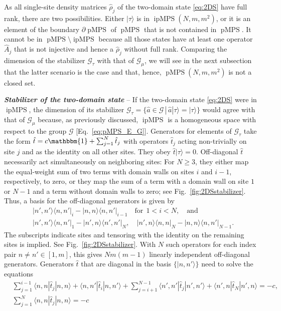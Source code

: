 \documentclass[english,11pt,aps,pra,onecolumn,tightenlines,groupedaddress,superscriptaddress,notitlepage,floatfix,fleqn]{revtex4-1}
\newcommand{\id}{\mathbbm{1}}
\newcommand{\bra}{\langle}
\newcommand{\ket}{\rangle}
\newcommand{\hA}{\hat{A}}
\newcommand{\hT}{\hat{t}}
\newcommand{\dm}{{\hat{\rho}}}
\newcommand{\mc}[1]{\mathcal{#1}}
\newcommand{\G}{\mc{G}}
\newcommand{\pMPS}{\operatorname{pMPS}}
\newcommand{\ipMPS}{\operatorname{ipMPS}}
\newcommand{\Emph}[1]{\textbf{\emph{#1}}}
\begin{document}
As all single-site density matrices $\dm_j$ of the two-domain state \eqref{eq:2DS} have full rank, there are two possibilities. Either $|\tau\ket$ is in $\ipMPS(N,m,m^2)$, or it is an element of the boundary $\partial\pMPS$ of $\pMPS$ that is not contained in $\pMPS$. It cannot be in $\pMPS\setminus \ipMPS$ because all those states have at least one operator $\hA_j$ that is not injective and hence a $\dm_j$ without full rank. Comparing the dimension of the stabilizer $\G_\tau$ with that of $\G_\mu$, we will see in the next subsection that the latter scenario is the case and that, hence, $\pMPS(N,m,m^2)$ is not a closed set.

\Emph{Stabilizer of the two-domain state} -- 
If the two-domain state \eqref{eq:2DS} were in $\ipMPS$, the dimension of its stabilizer $\G_\tau=\{\hat{a}\in\G\,|\,\hat{a}|\tau\ket=|\tau\ket\}$ would agree with that of $\G_{\mu}$ because, as previously discussed, $\ipMPS$ is a homogeneous space with respect to the group $\G$ [Eq.~\eqref{eq:pMPS_E_G}]. Generators for elements of $\G_\tau$ take the form $\hT=c\id+\sum_{j=1}^N\hT_j$ with operators $\hT_j$ acting non-trivially on site $j$ and as the identity on all other sites. They obey $\hT|\tau\ket=0$. Off-diagonal $\hT$ necessarily act simultaneously on neighboring sites: For $N\geq 3$, they either map the equal-weight sum of two terms with domain walls on sites $i$ and $i-1$, respectively, to zero, or they map the sum of a term with a domain wall on site $1$ or $N-1$ and a term without domain walls to zero; see Fig.~\ref{fig:2DSstabilizer}. Thus, a basis for the off-diagonal generators is given by
\begin{equation}\label{eq:2DSstabilizerOD}
\begin{split}
	&|n',n'\ket\bra n,n'|_i - |n,n\ket\bra n,n'|_{i-1}\quad\text{for} \ \ 1<i<N,\quad\text{and}\\
	&|n',n'\ket\bra n,n'|_1 - |n',n\ket\bra n',n'|_{N},\quad
	|n',n\ket\bra n,n|_N - |n,n\ket\bra n,n'|_{N-1}.
\end{split}
\end{equation}
The subscripts indicate sites and tensoring with the identity on the remaining sites is implied. See Fig.~\ref{fig:2DSstabilizer}. With $N$ such operators for each index pair $n\neq n'\in[1,m]$, this gives $Nm(m-1)$ linearly independent off-diagonal generators. Generators $\hT$ that are diagonal in the basis $\{|n,n'\ket\}$ need to solve the equations
\begin{equation}
\begin{split}
	&\textstyle\sum_{j=1}^{i-1}\bra n,n|\hT_j|n,n\ket+\bra n,n'|\hT_i|n,n'\ket+\sum_{j= i+1}^{N-1}\bra n',n'|\hT_j|n',n'\ket+\bra n',n|\hT_N|n',n\ket=-c,\\
	&\textstyle\sum_{j=1}^N\bra n,n|\hT_j|n,n\ket = -c
\end{split}
\end{equation}
\end{document}
